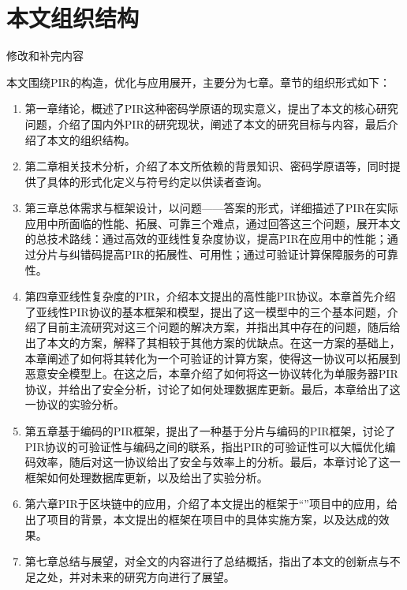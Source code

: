 \section{本文组织结构}
{修改和补完内容}

本文围绕PIR的构造，优化与应用展开，主要分为七章。章节的组织形式如下：
\begin{enumerate}
    \item 第一章绪论，概述了PIR这种密码学原语的现实意义，提出了本文的核心研究问题，介绍了国内外PIR的研究现状，阐述了本文的研究目标与内容，最后介绍了本文的组织结构。
    \item 第二章相关技术分析，介绍了本文所依赖的背景知识、密码学原语等，同时提供了具体的形式化定义与符号约定以供读者查询。
    \item 第三章总体需求与框架设计，以问题——答案的形式，详细描述了PIR在实际应用中所面临的性能、拓展、可靠三个难点，通过回答这三个问题，展开本文的总技术路线：通过高效的亚线性复杂度协议，提高PIR在应用中的性能；通过分片与纠错码提高PIR的拓展性、可用性；通过可验证计算保障服务的可靠性。
    \item 第四章亚线性复杂度的PIR，介绍本文提出的高性能PIR协议。本章首先介绍了亚线性PIR协议的基本框架和模型，提出了这一模型中的三个基本问题，介绍了目前主流研究对这三个问题的解决方案，并指出其中存在的问题，随后给出了本文的方案，解释了其相较于其他方案的优缺点。在这一方案的基础上，本章阐述了如何将其转化为一个可验证的计算方案，使得这一协议可以拓展到恶意安全模型上。在这之后，本章介绍了如何将这一协议转化为单服务器PIR协议，并给出了安全分析，讨论了如何处理数据库更新。最后，本章给出了这一协议的实验分析。
    \item 第五章基于编码的PIR框架，提出了一种基于分片与编码的PIR框架，讨论了PIR协议的可验证性与编码之间的联系，指出PIR的可验证性可以大幅优化编码效率，随后对这一协议给出了安全与效率上的分析。最后，本章讨论了这一框架如何处理数据库更新，以及给出了实验分析。
    \item 第六章PIR于区块链中的应用，介绍了本文提出的框架于“\projectname”项目中的应用，给出了项目的背景，本文提出的框架在项目中的具体实施方案，以及达成的效果。
    \item 第七章总结与展望，对全文的内容进行了总结概括，指出了本文的创新点与不足之处，并对未来的研究方向进行了展望。
\end{enumerate}